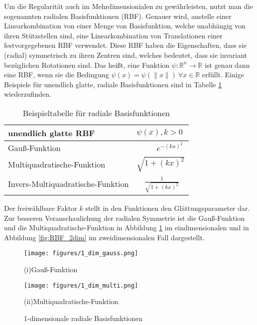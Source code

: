 \documentclass[12pt,titlepage]{article}
\begin{document}
Um die Regularität auch im Mehrdimensionialen zu gewährleisten, nutzt man die sogenannten radialen Basisfunktionen (RBF). Genauer wird, anstelle einer Linearkombination von einer Menge von Basisfunktion, welche unabhängig von ihren Stützstellen sind, eine Linearkombination von Translationen einer festvorgegebenen RBF verwendet. Diese RBF haben die Eigenschaften, dass sie (radial) symmetrisch zu ihren Zentren sind, welches bedeutet, dass sie invariant bezüglichen Rotationen sind. Das heißt, eine Funktion $\psi:\mathbb{R}^n\rightarrow\mathbb{R}$ ist genau dann eine RBF, wenn sie die Bedingung $\psi(x)=\psi(\|x\|)~\forall x\in\mathbb{R}$ erfüllt. Einige Beispiele für unendlich glatte, radiale Basisfunktionen sind in Tabelle \ref{tbl:funktionstabelle} wiederzufinden.
\begin{table}[H]
\centering
\begin{tabular}{|l|l|}
\hline
\textbf{unendlich glatte RBF}  & \textbf{$\psi(x), k>0$} \\
\hline
\rule{0pt}{15pt}Gauß-Funktion&~~~~~$e^{-(kx)^2}$\\
\rule{0pt}{15pt}Multiquadratische-Funktion& $\sqrt{1+(kx)^2}$\\
\rule{0pt}{15pt}Invers-Multiquadratische-Funktion&~~$\frac{1}{\sqrt{1+(kx)^2}}$\\
\hline
\end{tabular}
\caption{Beispieltabelle für radiale Basisfunktionen}
\label{tbl:funktionstabelle}
\end{table}
\noindent
Der freiwählbare Faktor $k$ stellt in den Funktionen den Glättungsparameter dar. Zur besseren Veranschaulichung der radialen Symmetrie ist die Gauß-Funktion und die Multiquadratische-Funktion in Abbildung \ref{fig:RBF_1dim} im eindimensionalen und in Abbildung \ref{fig:RBF_2dim} im zweidimensionalen Fall dargestellt.
\begin{figure}[H]
	\centering
\hspace{-1.4cm}
\begin{minipage}{0.45\textwidth}
	\texttt{[image: figures/1\_dim\_gauss.png]}
	\caption*{(i)Gauß-Funktion}
\end{minipage}
\hspace{0.5cm}
\begin{minipage}{0.45\textwidth}
	\texttt{[image: figures/1\_dim\_multi.png]}
	\caption*{(ii)Multiquadratische-Funktion}
\end{minipage}
	\caption{1-dimensionale radiale Basisfunktionen}
	\label{fig:RBF_1dim}
\end{figure}
\end{document}
